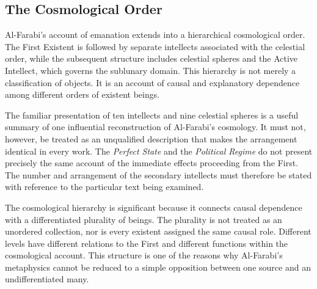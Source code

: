 
\subsection{The Cosmological Order}
\label{subsec:ch08-farabi-cosmology}

\label{para:VS.B01.P01.C08.S12.SS09.P001}

Al-Farabi's account of emanation
extends into a hierarchical
cosmological order. The First
Existent is followed by separate
intellects associated with the
celestial order, while the
subsequent structure includes
celestial spheres and the
Active Intellect, which governs
the sublunary domain. This
hierarchy is not merely a
classification of objects.
It is an account of causal
and explanatory dependence
among different orders of
existent beings.
\citep[sec.~4]{MennAlFarabiMetaphysicsSEP2026}

\label{para:VS.B01.P01.C08.S12.SS09.P002}

The familiar presentation of
ten intellects and nine celestial
spheres is a useful summary of
one influential reconstruction
of Al-Farabi's cosmology.
It must not, however, be
treated as an unqualified
description that makes the
arrangement identical in every
work. The \textit{Perfect State}
and the \textit{Political Regime}
do not present precisely the
same account of the immediate
effects proceeding from the
First. The number and arrangement
of the secondary intellects
must therefore be stated with
reference to the particular
text being examined.
\citep[sec.~4]{MennAlFarabiMetaphysicsSEP2026}

\label{para:VS.B01.P01.C08.S12.SS09.P003}

The cosmological hierarchy is
significant because it connects
causal dependence with a
differentiated plurality of
beings. The plurality is not
treated as an unordered
collection, nor is every existent
assigned the same causal role.
Different levels have different
relations to the First and
different functions within
the cosmological account.
This structure is one of the
reasons why Al-Farabi's
metaphysics cannot be reduced
to a simple opposition between
one source and an undifferentiated
many.

